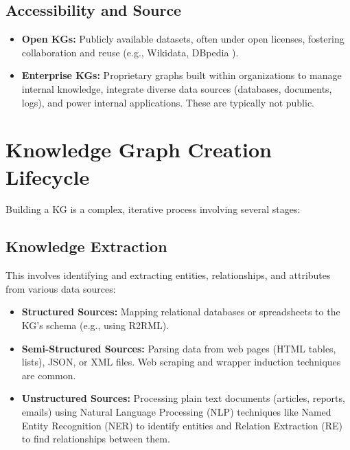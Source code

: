 \documentclass[11pt, a4paper]{article}
\begin{document}
\subsection{Accessibility and Source}
\label{subsec:accessibility}
\begin{itemize}
    \item \textbf{Open KGs:} Publicly available datasets, often under open licenses, fostering collaboration and reuse (e.g., Wikidata, DBpedia \cite{DBpedia}).
    \item \textbf{Enterprise KGs:} Proprietary graphs built within organizations to manage internal knowledge, integrate diverse data sources (databases, documents, logs), and power internal applications. These are typically not public.
\end{itemize}

\section{Knowledge Graph Creation Lifecycle}
\label{sec:creation_lifecycle}

Building a KG is a complex, iterative process involving several stages:

\subsection{Knowledge Extraction}
\label{subsec:extraction}
This involves identifying and extracting entities, relationships, and attributes from various data sources:
\begin{itemize}
    \item \textbf{Structured Sources:} Mapping relational databases or spreadsheets to the KG's schema (e.g., using R2RML).
    \item \textbf{Semi-Structured Sources:} Parsing data from web pages (HTML tables, lists), JSON, or XML files. Web scraping and wrapper induction techniques are common.
    \item \textbf{Unstructured Sources:} Processing plain text documents (articles, reports, emails) using Natural Language Processing (NLP) techniques like Named Entity Recognition (NER) to identify entities and Relation Extraction (RE) to find relationships between them.
\end{itemize}
\end{document}
